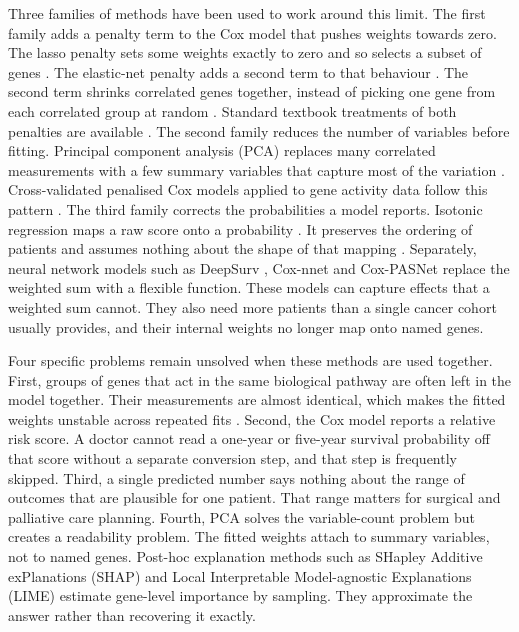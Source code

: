 \documentclass[10pt,a4paper]{article}
\begin{document}
Three families of methods have been used to work around this limit. The first
family adds a penalty term to the Cox model that pushes weights towards zero.
The lasso penalty sets some weights exactly to zero and so selects a subset of
genes \citep{tibshirani1997lasso}. The elastic-net penalty adds a second
term to that behaviour \citep{zou2005regularization, wu2012elastic}. The second
term shrinks correlated genes together, instead of picking one gene from each
correlated group at random \citep{simon2011regularization}. Standard textbook
treatments of both penalties are available \citep{hastie2009elements}. The
second family reduces the number of variables before fitting. Principal
component analysis (PCA) replaces many correlated measurements with a few
summary variables that capture most of the variation
\citep{hotelling1933analysis, jolliffe2016principal}. Cross-validated penalised
Cox models applied to gene activity data follow this pattern
\citep{vanhouwelingen2006crossvalidated}. The third family corrects the
probabilities a model reports. Isotonic regression maps a raw score onto a
probability \citep{ayer1955empirical}. It preserves the ordering of patients and
assumes nothing about the shape of that mapping \citep{zadrozny2002transforming}.
Separately, neural network models such as DeepSurv \citep{katzman2018deepsurv},
Cox-nnet \citep{ching2018coxnnet} and Cox-PASNet \citep{hao2019coxpasnet}
replace the weighted sum with a flexible function. These models can capture
effects that a weighted sum cannot. They also need more patients than a single
cancer cohort usually provides, and their internal weights no longer map onto
named genes.

Four specific problems remain unsolved when these methods are used together.
First, groups of genes that act in the same biological pathway are often left in
the model together. Their measurements are almost identical, which makes the
fitted weights unstable across repeated fits \citep{simon2011regularization}.
Second, the Cox model reports a relative risk score. A doctor cannot read a
one-year or five-year survival probability off that score without a separate
conversion step, and that step is frequently skipped. Third, a single predicted
number says nothing about the range of outcomes that are plausible for one
patient. That range matters for surgical and palliative care planning. Fourth,
PCA solves the variable-count problem but creates a readability problem. The
fitted weights attach to summary variables, not to named genes. Post-hoc
explanation methods such as SHapley Additive exPlanations (SHAP)
\citep{lundberg2017unified} and Local Interpretable Model-agnostic Explanations
(LIME) \citep{ribeiro2016why} estimate gene-level importance by sampling. They
approximate the answer rather than recovering it exactly.
\end{document}
